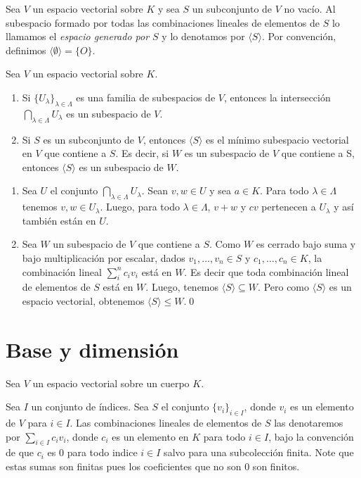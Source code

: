 \begin{defn}
Sea $V$ un espacio vectorial sobre $K$ y sea $S$ un subconjunto de $V$ no vac\'io. Al subespacio formado por todas las combinaciones lineales de elementos de $S$ lo llamamos el \emph{espacio generado por $S$} y lo denotamos por $\langle S \rangle$. Por convenci\'on, definimos $\langle \emptyset\rangle=\{O\}$.
\end{defn}

\begin{prop}\label{propunion}
Sea $V$ un espacio vectorial sobre $K$.
\begin{enumerate}
\item Si $\{U_\lambda\}_{\lambda\in\Lambda}$ es una familia de subespacios de $V$, entonces la intersecci\'on $\bigcap_{\lambda\in\Lambda} U_\lambda$ es un subespacio de $V$.
\item Si $S$ es un subconjunto de $V$, entonces $\langle S\rangle$ es el m\'inimo subespacio vectorial en $V$ que contiene a $S$. Es decir, si $W$ es un subespacio de $V$ que contiene a S, entonces $\langle S\rangle$ es un subespacio de $W$.
\end{enumerate}
\end{prop}

\dem
\begin{enumerate}
\item Sea $U$ el conjunto $\bigcap_{\lambda\in\Lambda} U_\lambda$. Sean $v,w\in U$ y sea $a\in K$. Para todo $\lambda\in\Lambda$ tenemos $v,w\in U_\lambda$. Luego, para todo $\lambda\in\Lambda$, $v+w$ y $cv$ pertenecen a $U_\lambda$ y as\'i tambi\'en est\'an en $U$.
\item Sea  $W$ un subespacio de $V$ que contiene a $S$. Como $W$ es cerrado bajo suma y bajo multiplicaci\'on por escalar, dados $v_1,\ldots,v_n\in S$ y $c_1,\ldots,c_n\in K$, la combinaci\'on lineal $\sum_i^{n} c_iv_i$ est\'a en $W$. Es decir que toda combinaci\'on lineal de elementos de $S$ est\'a en $W$. Luego, tenemos $\langle S\rangle \subseteq W$. Pero como $\langle S\rangle$ es un espacio vectorial, obtenemos $\langle S\rangle \le W$.\qed
\end{enumerate}

\section{Base y dimensi\'on}

Sea $V$ un espacio vectorial sobre un cuerpo $K$.

\begin{nota}
Sea $I$ un conjunto de \'indices. Sea $S$ el conjunto $\{v_i\}_{i\in I}$, donde $v_i$ es un elemento de $V$ para $i\in I$. Las combinaciones lineales de elementos de $S$ las denotaremos por
$\sum_{i\in I} c_iv_i$, donde $c_i$ es un elemento en $K$ para todo $i\in I$, bajo la convenci\'on de que $c_i$ es $0$ para todo indice $i\in I$ salvo para una subcolecci\'on finita. Note que estas sumas son finitas pues los coeficientes que no son $0$ son finitos.
\end{nota}

